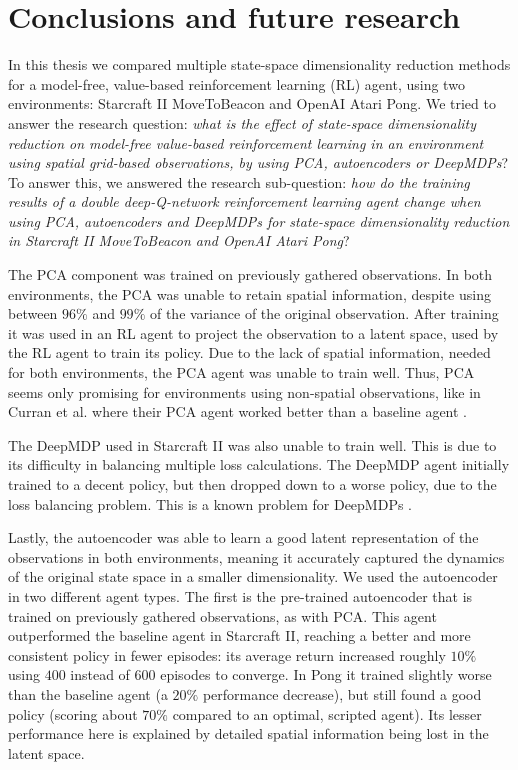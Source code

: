 \chapter{Conclusions and future research}\label{conclusions}
In this thesis we compared multiple state-space dimensionality reduction methods for a model-free, value-based reinforcement learning (RL) agent, using two environments: Starcraft II MoveToBeacon and OpenAI Atari Pong. We tried to answer the research question: \textit{what is the effect of state-space dimensionality reduction on model-free value-based reinforcement learning in an environment using spatial grid-based observations, by using PCA, autoencoders or DeepMDPs}? To answer this, we answered the research sub-question: \textit{how do the training results of a double deep-Q-network reinforcement learning agent change when using PCA, autoencoders and DeepMDPs for state-space dimensionality reduction in Starcraft II MoveToBeacon and OpenAI Atari Pong}? 

The PCA component was trained on previously gathered observations. In both environments, the PCA was unable to retain spatial information, despite using between $96\%$ and $99\%$ of the variance of the original observation. After training it was used in an RL agent to project the observation to a latent space, used by the RL agent to train its policy. Due to the lack of spatial information, needed for both environments, the PCA agent was unable to train well. Thus, PCA seems only promising for environments using non-spatial observations, like in Curran et al. where their PCA agent worked better than a baseline agent \cite{mario}.

The DeepMDP used in Starcraft II was also unable to train well. This is due to its difficulty in balancing multiple loss calculations. The DeepMDP agent initially trained to a decent policy, but then dropped down to a worse policy, due to the loss balancing problem. This is a known problem for DeepMDPs \cite{deepmdp}.

Lastly, the autoencoder was able to learn a good latent representation of the observations in both environments, meaning it accurately captured the dynamics of the original state space in a smaller dimensionality. We used the autoencoder in two different agent types. The first is the pre-trained autoencoder that is trained on previously gathered observations, as with PCA. This agent outperformed the baseline agent in Starcraft II, reaching a better and more consistent policy in fewer episodes: its average return increased roughly $10\%$ using $400$ instead of $600$ episodes to converge. In Pong it trained slightly worse than the baseline agent (a $20\%$ performance decrease), but still found a good policy (scoring about $70\%$ compared to an optimal, scripted agent). Its lesser performance here is explained by detailed spatial information being lost in the latent space.

